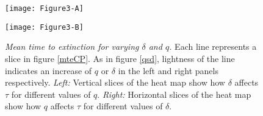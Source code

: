 \iffalse
\begin{figure}[h]
	\centering
	\subfloat[\emph{Varying $\delta$}]{\texttt{[image: Figure3-A]}\label{mte:delta}}
	\hfill
	\subfloat[\emph{Varying $q$} ]{\texttt{[image: Figure3-B]}\label{mte:q}}
	\caption{\emph{Mean time to extinction for varying $\delta$ and $q$} Each line represents a slice in Figure \ref{mteCP}: Figure \ref{mte:delta} are vertical slices which show how, for different values of $q$, the $\delta$ affects $\tau$. Similarly Figure \ref{mte:q} are horizontal slices which show how, for different values of $\delta$, the $q$ affects $\tau$. As in Figure \ref{qsd}, lightness of the line indicates an increase of \ref{mte:delta} $q$ and \ref{mte:q} $\delta$}
	\label{mte}
\end{figure}
\fi
\begin{figure}[h]
	\centering
	\begin{minipage}{0.49\linewidth}
		\centering
		\texttt{[image: Figure3-A]}
	\end{minipage}
	\begin{minipage}{0.49\linewidth}
		\centering
		\texttt{[image: Figure3-B]}
	\end{minipage}
	\caption{\emph{Mean time to extinction for varying $\delta$ and $q$.} Each line represents a slice in figure \ref{mteCP}. As in figure \ref{qsd}, lightness of the line indicates an increase of $q$ or $\delta$ in the left and right panels respectively. 
	\emph{Left:} Vertical slices of the heat map show how $\delta$ affects $\tau$ for different values of $q$. 
	\emph{Right:} Horizontal slices of the heat map show how $q$ affects $\tau$ for different values of $\delta$. 
	}
	\label{mte}
\end{figure}

